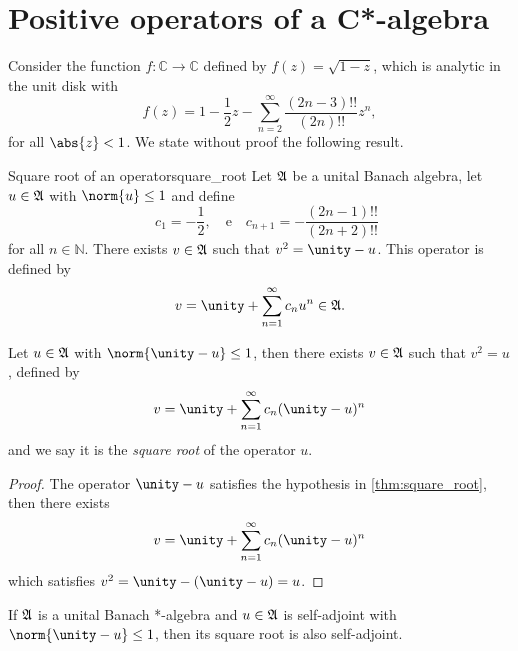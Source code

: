\section{Positive operators of a C*-algebra}
Consider the function \(f : \mathbb{C} \to \mathbb{C}\) defined by \(f(z) = \sqrt{1 - z}\), which is analytic in the unit disk with
\begin{equation*}
    f(z) = 1 - \frac12z - \sum_{n = 2}^\infty \frac{(2n - 3)!!}{(2n)!!} z^n,
\end{equation*}
for all \(\abs{z} < 1\). We state without proof the following result.
\begin{theorem}{Square root of an operator}{square_root}
    Let \(\mathfrak{A}\) be a unital Banach algebra, let \(u \in \mathfrak{A}\) with \(\norm{u} \leq 1\) and define
    \begin{equation*}
        \quad c_1 = -\frac12,\quad\text{e}\quad c_{n+1} = -\frac{(2n - 1)!!}{(2n + 2)!!}
    \end{equation*}
    for all \(n \in \mathbb{N}\). There exists \(v \in \mathfrak{A}\) such that \(v^2 = \unity - u\). This operator is defined by
    \begin{equation*}
        v = \unity + \sum_{n = 1}^\infty c_n u^n \in \algebra{A}.
    \end{equation*}
\end{theorem}
\begin{corollary}
    Let \(u \in \mathfrak{A}\) with \(\norm{\unity - u} \leq 1\), then there exists \(v \in \mathfrak{A}\) such that \(v^2 = u\), defined by
    \begin{equation*}
        v = \unity + \sum_{n=1}^\infty c_n (\unity - u)^n
    \end{equation*}
    and we say it is the \emph{square root} of the operator \(u\).
\end{corollary}
\begin{proof}
    The operator \(\unity - u\) satisfies the hypothesis in \cref{thm:square_root}, then there exists
    \begin{equation*}
        v = \unity + \sum_{n = 1}^\infty c_n (\unity - u)^n
    \end{equation*}
    which satisfies \(v^2 = \unity - (\unity - u) = u\).
\end{proof}
\begin{corollary}
    If \(\mathfrak{A}\) is a unital Banach *-algebra and \(u \in \mathfrak{A}\) is self-adjoint with \(\norm{\unity - u} \leq 1\), then its square root is also self-adjoint.
\end{corollary}
